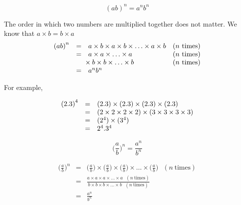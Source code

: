 

{
 $$ {(ab)}^{n}={a}^{n}{b}^{n}$$

\par
The order in which two numbers are multiplied together does not matter. We know that $a \times b = b \times a$ 
\begin{equation*}
\begin{array}{cclc}\hfill {(ab)}^{n}& =& a  \times b  \times a  \times b  \times \ldots  \times a  \times b\hfill & (\mbox{$n$ times})\hfill \\
	\hfill & =& a  \times a  \times \ldots  \times a\hfill & (\mbox{$n$ times})\hfill \\
	\hfill & & \phantom{\rule{-0.166667em}{0ex}}\phantom{\rule{-0.166667em}{0ex}}\phantom{\rule{-0.166667em}{0ex}}\phantom{\rule{-0.166667em}{0ex}}  \times b  \times b  \times \ldots  \times b\hfill & (\mbox{$n$ times})\hfill \\
	\hfill & =& {a}^{n}{b}^{n}\hfill & 
\end{array}
\end{equation*}
}

For example,

\begin{equation*}
    \begin{array}{ccl}\hfill {(2  .3)}^{4}& =& (2  .3)  \times (2  .3)  \times (2  .3)  \times (2  .3)\hfill \\
	    & =& (2  \times 2  \times 2  \times 2)  \times (3  \times 3  \times 3  \times 3)\hfill \\
	    & =& ({2}^{4})  \times ({3}^{4})\hfill \\ & =& {2}^{4}.{3}^{4}\hfill 
    \end{array}
\end{equation*}




{
$$ \Big(\frac{a}{b}\Big)^n = \frac{a^n}{b^n} $$

\begin{eqnarray*}

 \Big(\frac{a}{b}\Big)^n & = & \Big(\frac{a}{b}\Big) \times \Big(\frac{a}{b}\Big) \times \Big(\frac{a}{b}\Big) \times \ldots \times \Big(\frac{a}{b}\Big) ~~~(n~\mbox{times}) \\
                         & = & \frac{a \times a \times a \times \ldots \times a ~~~(n~\mbox{times})}{b \times b \times b \times \ldots \times b ~~~(n~\mbox{times})}\\
                         & = & \frac{a^n}{b^n}
\end{eqnarray*}



}




